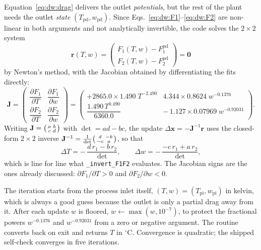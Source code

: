 \documentclass[11pt]{article}
\newcommand{\degC}{\ensuremath{^{\circ}\mathrm{C}}}
\begin{document}
Equation~\eqref{eq:dw:drag} delivers the outlet \emph{potentials}, but the
rest of the plant needs the outlet \emph{state}
$(T_{\mathrm{pd}},w_{\mathrm{pd}})$. Since
Eqs.~\eqref{eq:dw:F1}--\eqref{eq:dw:F2} are non-linear in both arguments and
not analytically invertible, the code solves the $2\times2$ system
\begin{equation}
\mathbf{r}(T,w)=
\begin{pmatrix}
F_1(T,w)-F_1^{\mathrm{pd}}\\[2pt]
F_2(T,w)-F_2^{\mathrm{pd}}
\end{pmatrix}=\mathbf{0}
\label{eq:dw:residual}
\end{equation}
by Newton's method, with the Jacobian obtained by differentiating the fits
directly:
\begin{equation}
\mathbf{J}=
\begin{pmatrix}
\dfrac{\partial F_1}{\partial T} & \dfrac{\partial F_1}{\partial w}\\[10pt]
\dfrac{\partial F_2}{\partial T} & \dfrac{\partial F_2}{\partial w}
\end{pmatrix}
=
\begin{pmatrix}
+2865.0\times 1.490\;T^{-2.490} & 4.344\times 0.8624\;w^{-0.1376}\\[6pt]
\dfrac{1.490\,T^{0.490}}{6360.0} & -\,1.127\times 0.07969\;w^{-0.92031}
\end{pmatrix}.
\label{eq:dw:jacobian}
\end{equation}
Writing $\mathbf{J}=\begin{psmallmatrix}a&b\\c&d\end{psmallmatrix}$ with
$\det = ad-bc$, the update $\Delta\mathbf{x}=-\mathbf{J}^{-1}\mathbf{r}$ uses
the closed-form $2\times2$ inverse
$\mathbf{J}^{-1}=\tfrac{1}{\det}\begin{psmallmatrix}d&-b\\-c&a\end{psmallmatrix}$,
so that
\begin{equation}
\Delta T = -\,\frac{d\,r_1 - b\,r_2}{\det},
\qquad
\Delta w = -\,\frac{-c\,r_1 + a\,r_2}{\det},
\label{eq:dw:update}
\end{equation}
which is line for line what \texttt{\_invert\_F1F2} evaluates. The Jacobian
signs are the ones already discussed: $\partial F_1/\partial T>0$ and
$\partial F_2/\partial w<0$.

The iteration starts from the process inlet itself,
$(T,w)=(T_{\mathrm{pi}},w_{\mathrm{pi}})$ in kelvin, which is always a good
guess because the outlet is only a partial drag away from it. After each
update $w$ is floored, $w \leftarrow \max(w,10^{-7})$, to protect the
fractional powers $w^{-0.1376}$ and $w^{-0.92031}$ from a zero or negative
argument. The routine converts back on exit and returns $T$ in \degC.
Convergence is quadratic; the shipped self-check converges in five iterations.
\end{document}

